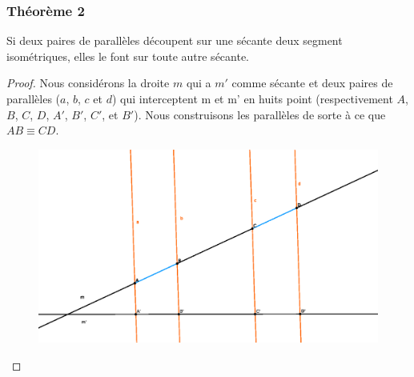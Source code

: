 \documentclass[a4paper,12pt]{article}
\begin{document}
\pagebreak
\subsubsection{Théorème 2}
\begin{theorem}\label{semblableTh2}
Si deux paires de parallèles découpent sur une sécante deux segment isométriques, elles le font sur toute autre sécante.
\end{theorem}

\begin{proof}
Nous considérons la droite $m$ qui a $m'$ comme sécante et deux paires de parallèles ($a$, $b$, $c$ et $d$) qui interceptent m et m' en huits point (respectivement $A$, $B$, $C$, $D$, $A'$, $B'$, $C'$, et $B'$). Nous construisons les parallèles de sorte à ce que $AB \equiv CD$.

\begin{figure}[H]
        \centering
        \includegraphics[scale=0.9]{semblable2-1.eps}
    \end{figure}


\end{proof}
\end{document}
